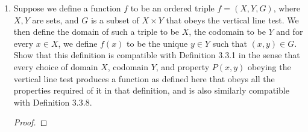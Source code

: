 \documentclass[../../main.tex]{subfiles}
\begin{document}
\begin{enumerate}
        
    \begin{proof}
        
    \end{proof}
    \begin{xx}
        
    \end{xx}
    \item \begin{q}
        Suppose we define a function $f$ to be an ordered triple $f = (X, Y, G)$, where $X, Y$ are sets, and $G$ is a subset of $X \times Y$ that obeys the vertical line test. We then define the domain of such a triple to be $X$, the codomain to be $Y$ and for every $x \in X$, we define $f(x)$ to be the unique $y \in Y$ such that $(x, y) \in G$. Show that this definition is compatible with Definition 3.3.1 in the sense that every choice of domain $X$, codomain $Y$, and property $P(x, y)$ obeying the vertical line test produces a function as defined here that obeys all the properties required of it in that definition, and is also similarly compatible with Definition 3.3.8.
    \end{q}
        
    \begin{proof}
        
    \end{proof}
    \begin{xx}
        
    \end{xx}

\end{enumerate}
\end{document}

